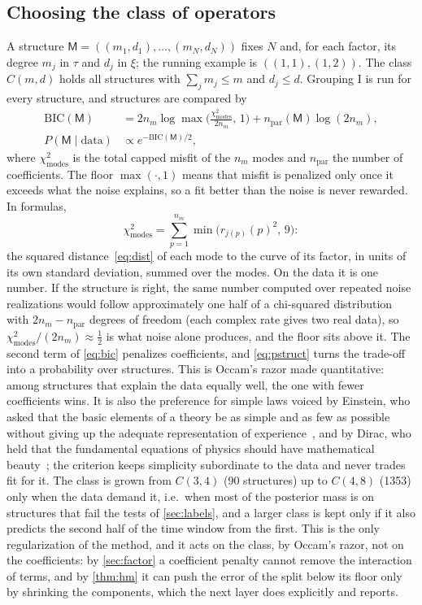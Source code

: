 \documentclass[11pt]{article}
\theoremstyle{plain}
\theoremstyle{definition}
\theoremstyle{remark}
\newcommand{\Mfit}{\mathsf{M}}              %
\begin{document}
\subsection{Choosing the class of operators}\label{sec:class}
A structure $\Mfit=((m_1,d_1),\dots,(m_N,d_N))$ fixes $N$ and, for each factor, its degree $m_j$ in $\tau$ and $d_j$ in
$\xi$; the running example is $((1,1),(1,2))$. The class $C(m,d)$ holds all structures with $\sum_jm_j\le m$ and
$d_j\le d$. Grouping I is run for every structure, and structures are compared by
\begin{align}
  \mathrm{BIC}(\Mfit)&=2n_m\log\max\!\Big(\frac{\chi^2_{\mathrm{modes}}}{2n_m},\,1\Big)+n_{\mathrm{par}}(\Mfit)\log(2n_m),\label{eq:bic}\\
  P(\Mfit\mid\text{data})&\propto e^{-\mathrm{BIC}(\Mfit)/2},\label{eq:pstruct}
\end{align}
where $\chi^2_{\mathrm{modes}}$ is the total capped misfit of the $n_m$ modes and $n_{\mathrm{par}}$ the number of coefficients. The floor
$\max(\cdot,1)$ means that misfit is penalized only once it exceeds what the noise explains, so a fit better than the
noise is never rewarded. In formulas,
\[
  \chi^2_{\mathrm{modes}}=\sum_{p=1}^{n_m}\min\big(r_{j(p)}(p)^2,\,9\big):
\]
the squared distance~\eqref{eq:dist} of each mode to the curve of its factor, in units of its own standard deviation,
summed over the modes. On the data it is one number. If the structure is right, the same number computed over repeated
noise realizations would follow approximately one half of a chi-squared distribution with $2n_m-n_{\mathrm{par}}$ degrees
of freedom (each complex rate gives two real data), so $\chi^2_{\mathrm{modes}}/(2n_m)\approx\frac12$ is what noise alone
produces, and the floor sits above it. The second term of \eqref{eq:bic} penalizes coefficients, and \eqref{eq:pstruct}
turns the trade-off into a probability over structures. This is Occam's razor made quantitative: among structures that
explain the data equally well, the one with fewer coefficients wins. It is also the preference for simple laws voiced by
Einstein, who asked that the basic elements of a theory be as simple and as few as possible without giving up the
adequate representation of experience~\cite{Ein34}, and by Dirac, who held that the fundamental equations of physics
should have mathematical beauty~\cite{Dir63}; the criterion keeps simplicity subordinate to the data and never trades fit
for it. The class is grown from $C(3,4)$ (90 structures) up to $C(4,8)$ (1353) only when the data demand
it, i.e.\ when most of the posterior mass is on structures that fail the tests of \cref{sec:labels}, and a larger class is
kept only if it also predicts the second half of the time window from the first. This is the only regularization of the
method, and it acts on the class, by Occam's razor, not on the coefficients: by \cref{sec:factor} a coefficient penalty
cannot remove the interaction of terms, and by \cref{thm:hm} it can push the error of the split below its floor only by
shrinking the components, which the next layer does explicitly and reports.
\end{document}
